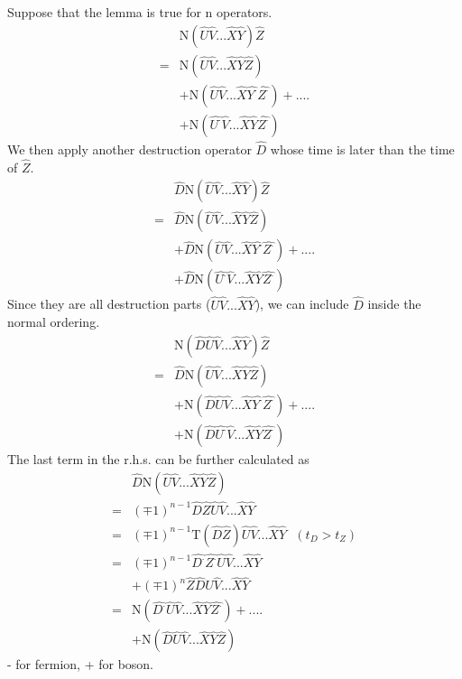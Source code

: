 ﻿\documentclass[twoside]{book}
\numberwithin{equation}{section}
\begin{document}
Suppose that the lemma is true for n operators.
\begin{align}
&\mathrm{N}(\hat{U}\hat{V}...\hat{X}\hat{Y})\hat{Z} \nonumber \\
=&\mathrm{N}(\hat{U}\hat{V}...\hat{X}\hat{Y}\hat{Z})\nonumber \\
&+\mathrm{N}(\hat{U}\hat{V}...\hat{X}\hat{Y^{\cdot}}\hat{Z^{\cdot}})+....\nonumber \\
&+\mathrm{N}(\hat{U^{\cdot}}\hat{V}...\hat{X}\hat{Y}\hat{Z^{\cdot}})\nonumber
\end{align}
We then apply  another destruction operator $\hat{D}$ whose time is later than the time of $\hat{Z}$.
\begin{align}
&\hat{D}\mathrm{N}(\hat{U}\hat{V}...\hat{X}\hat{Y})\hat{Z} \nonumber \\
=&\hat{D}\mathrm{N}(\hat{U}\hat{V}...\hat{X}\hat{Y}\hat{Z})\nonumber \\
&+\hat{D}\mathrm{N}(\hat{U}\hat{V}...\hat{X}\hat{Y^{\cdot}}\hat{Z^{\cdot}})+....\nonumber \\
&+\hat{D}\mathrm{N}(\hat{U^{\cdot}}\hat{V}...\hat{X}\hat{Y}\hat{Z^{\cdot}})\nonumber
\end{align}
Since they are all destruction parts ($\hat{U}\hat{V}...\hat{X}\hat{Y}$), we can include $\hat{D}$ inside the normal ordering.
\begin{align}
&\mathrm{N}(\hat{D}\hat{U}\hat{V}...\hat{X}\hat{Y})\hat{Z} \nonumber \\
=&\hat{D}\mathrm{N}(\hat{U}\hat{V}...\hat{X}\hat{Y}\hat{Z})\nonumber \\
&+\mathrm{N}(\hat{D}\hat{U}\hat{V}...\hat{X}\hat{Y^{\cdot}}\hat{Z^{\cdot}})+....\nonumber \\
&+\mathrm{N}(\hat{D}\hat{U^{\cdot}}\hat{V}...\hat{X}\hat{Y}\hat{Z^{\cdot}})\nonumber
\end{align}
The last term in the r.h.s. can be further calculated as
\begin{align}
&\hat{D}\mathrm{N}(\hat{U}\hat{V}...\hat{X}\hat{Y}\hat{Z})\nonumber \\
=&(\mp 1)^{n-1}\hat{D}\hat{Z}\hat{U}\hat{V}...\hat{X}\hat{Y}  \nonumber \\
=&(\mp 1)^{n-1}\mathrm{T}(\hat{D}\hat{Z})\hat{U}\hat{V}...\hat{X}\hat{Y} \ \ \ (t_D>t_Z) \nonumber \\
=&(\mp 1)^{n-1}\hat{D^{\cdot}}\hat{Z^{\cdot}}\hat{U}\hat{V}...\hat{X}\hat{Y}  \nonumber \\
&+(\mp 1)^{n}\hat{Z}\hat{D}\hat{U}\hat{V}...\hat{X}\hat{Y}  \nonumber \\
=&\mathrm{N}(\hat{D^{\cdot}}\hat{U}\hat{V}...\hat{X}\hat{Y}\hat{Z^{\cdot}})+....\nonumber \\
&+\mathrm{N}(\hat{D}\hat{U}\hat{V}...\hat{X}\hat{Y}\hat{Z})\nonumber
\end{align}
- for fermion, + for boson.
\end{document}
